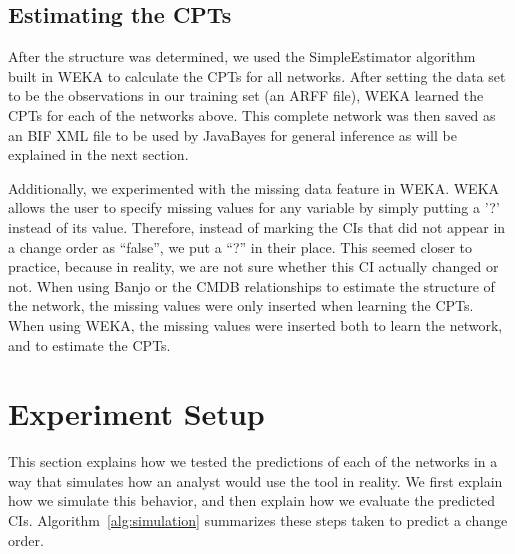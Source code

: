\documentclass[10pt,twocolumn,letterpaper]{article}
\begin{document}
\subsection{Estimating the CPTs}
\label{sec:cpt}

After the structure was determined, we used the SimpleEstimator algorithm~\cite{witten2005data} built in WEKA to calculate the CPTs for all networks. After
setting the data set to be the observations in our training set (an ARFF file), WEKA learned the CPTs for each of the
networks above. This complete network was then saved as an BIF XML file to be used by JavaBayes for general inference as will be explained in the next section.

Additionally, we experimented with the missing data feature in WEKA. WEKA allows the user to specify missing values
for any variable by simply putting a '?' instead of its value. Therefore, instead of marking the CIs that did not appear in a change order as ``false'', we put
a
``?'' in their place. This seemed closer to practice, because in reality, we are not sure whether this CI actually changed or not. When using Banjo or the CMDB
relationships to estimate the structure of the network, the missing values were only inserted when learning the CPTs. When using WEKA, the missing values were
inserted both to learn the network, and to estimate the CPTs.


\section{Experiment Setup}
\label{sec:setup}

This section explains how we tested the predictions of each of the networks in a way that simulates how an analyst would use the tool in reality. We first
explain how we simulate this behavior, and then explain how we evaluate the predicted CIs. Algorithm~\ref{alg:simulation} summarizes these steps taken to
predict a change order.
\end{document}
